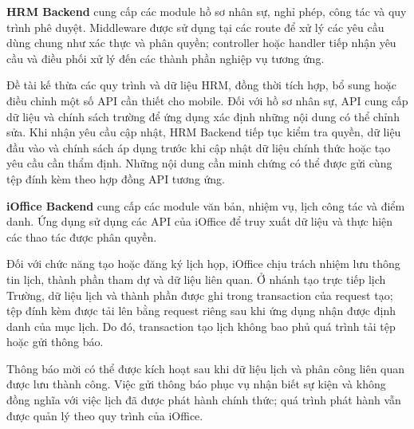 \textbf{HRM Backend} cung cấp các module hồ sơ nhân sự, nghỉ phép, công tác và quy trình phê duyệt. Middleware được sử dụng tại các route để xử lý các yêu cầu dùng chung như xác thực và phân quyền; controller hoặc handler tiếp nhận yêu cầu và điều phối xử lý đến các thành phần nghiệp vụ tương ứng.

Đề tài kế thừa các quy trình và dữ liệu HRM, đồng thời tích hợp, bổ sung hoặc điều chỉnh một số API cần thiết cho mobile. Đối với hồ sơ nhân sự, API cung cấp dữ liệu và chính sách trường để ứng dụng xác định những nội dung có thể chỉnh sửa. Khi nhận yêu cầu cập nhật, HRM Backend tiếp tục kiểm tra quyền, dữ liệu đầu vào và chính sách áp dụng trước khi cập nhật dữ liệu chính thức hoặc tạo yêu cầu cần thẩm định. Những nội dung cần minh chứng có thể được gửi cùng tệp đính kèm theo hợp đồng API tương ứng.

\textbf{iOffice Backend} cung cấp các module văn bản, nhiệm vụ, lịch công tác và điểm danh. Ứng dụng sử dụng các API của iOffice để truy xuất dữ liệu và thực hiện các thao tác được phân quyền.

Đối với chức năng tạo hoặc đăng ký lịch họp, iOffice chịu trách nhiệm lưu thông tin lịch, thành phần tham dự và dữ liệu liên quan. Ở nhánh tạo trực tiếp lịch Trường, dữ liệu lịch và thành phần được ghi trong transaction của request tạo; tệp đính kèm được tải lên bằng request riêng sau khi ứng dụng nhận được định danh của mục lịch. Do đó, transaction tạo lịch không bao phủ quá trình tải tệp hoặc gửi thông báo.

Thông báo mời có thể được kích hoạt sau khi dữ liệu lịch và phân công liên quan được lưu thành công. Việc gửi thông báo phục vụ nhận biết sự kiện và không đồng nghĩa với việc lịch đã được phát hành chính thức; quá trình phát hành vẫn được quản lý theo quy trình của iOffice.

